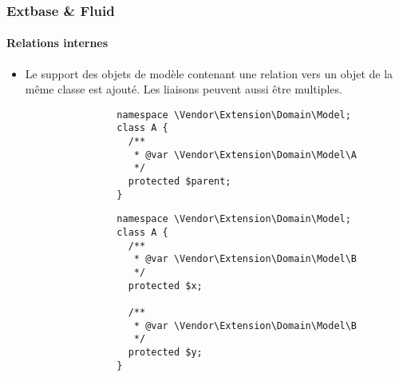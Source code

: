 \begin{frame}[fragile]
	\frametitle{Extbase \& Fluid}
	\framesubtitle{Relations internes}

	\lstset{basicstyle=\tiny\ttfamily}

	\begin{itemize}

		\item Le support des objets de modèle contenant une relation vers
			un objet de la même classe est ajouté. Les liaisons peuvent aussi être multiples.

			\begin{lstlisting}
				namespace \Vendor\Extension\Domain\Model;
				class A {
				  /**
				   * @var \Vendor\Extension\Domain\Model\A
				   */
				  protected $parent;
				}
			\end{lstlisting}

			\begin{lstlisting}
				namespace \Vendor\Extension\Domain\Model;
				class A {
				  /**
				   * @var \Vendor\Extension\Domain\Model\B
				   */
				  protected $x;

				  /**
				   * @var \Vendor\Extension\Domain\Model\B
				   */
				  protected $y;
				}
			\end{lstlisting}

	\end{itemize}

\end{frame}


